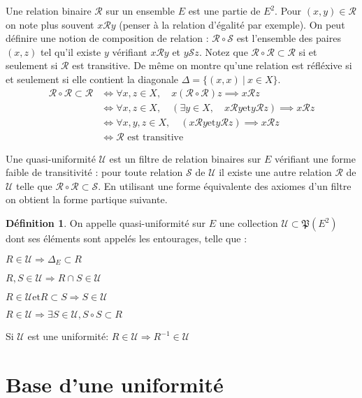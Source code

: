 \documentclass[a4paper, 11pt, french]{book}
\newenvironment{itemise}{\itemize}{\enditemize}
\theoremstyle{plain} %
\theoremstyle{definition} %
\newtheorem{definition}{Définition}
\theoremstyle{remark} %
\newcommand{\1}{\mathds{1}}
\newcommand{\inv}[1]{#1^{-1}}
\newcommand{\et}{\mathrel{\mathrm{et}}}
\renewcommand{\cal}[1]{\mathcal{#1}}
\renewcommand{\frak}[1]{\mathfrak{#1}}
\newcommand{\scr}[1]{\mathscr{#1}}
\newcommand\ens[2]{\{#1 \ |\ #2\}}
\begin{document}
Une relation binaire $\cal{R}$ sur un ensemble $E$ est une partie de $E^2$.
Pour $(x, y)\in\cal{R}$ on note plus souvent $x\cal{R}y$ (penser à la relation d'égalité par exemple).
On peut définire une notion de composition de relation : $\cal{R}\circ\cal{S}$ est l'ensemble des paires $(x, z)$ tel qu'il existe $y$ vérifiant $x\cal{R}y$ et $y\cal{S}z$.
Notez que $\cal{R}\circ\cal{R}\subset\cal{R}$ si et seulement si $\cal{R}$ est transitive.
De même on montre qu'une relation est réfléxive si et seulement si elle contient la diagonale $\Delta=\ens{(x, x)}{x\in X}$.
\begin{align*}
	\cal{R}\circ\cal{R}\subset\cal{R}
	&\iff \forall x, z\in X, \quad x(\cal{R}\circ\cal{R})z\implies x\cal{R}z \\
	&\iff \forall x, z\in X, \quad (\exists y\in X, \quad x\cal{R}y\et y\cal{R}z) \implies x\cal{R}z \\
	&\iff \forall x, y, z\in X, \quad (x\cal{R}y\et y\cal{R}z) \implies x\cal{R}z \\	
	&\iff \text{$\cal{R}$ est transitive}
\end{align*}

Une quasi-uniformité $\scr{U}$ est un filtre de relation binaires sur $E$ vérifiant une forme faible de transitivité :
pour toute relation $\cal{S}$ de $\scr{U}$ il existe une autre relation $\cal{R}$ de $\scr{U}$ telle que $\cal{R}\circ\cal{R}\subset\cal{S}$.
En utilisant une forme équivalente des axiomes d'un filtre on obtient la forme partique suivante.
\begin{definition}
	On appelle quasi-uniformité sur $E$ une collection $\scr{U}\subset\frak{P}(E^2)$ dont ses éléments sont appelés les entourages, telle que :
	\begin{itemise}
		\item $R\in\scr{U}\Rightarrow\Delta_E\subset R$
		\item $R, S\in\scr{U}\Rightarrow R\cap S\in\scr{U}$
		\item $R\in\scr{U}\et R\subset S\Rightarrow S\in\scr{U}$
		\item $R\in\scr{U}\Rightarrow\exists S\in\scr{U}, S\circ S\subset R$
		\item Si $\scr{U}$ est une uniformité: $R\in\scr{U}\Rightarrow\inv{R}\in\scr{U}$
	\end{itemise}
\end{definition}

\section{Base d'une uniformité}
\end{document}
